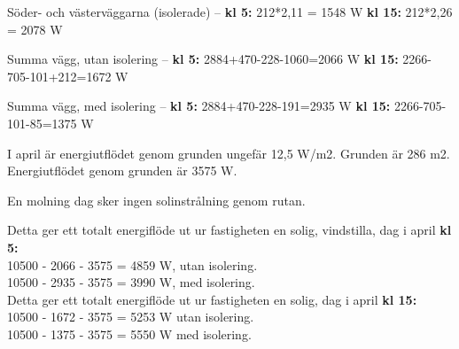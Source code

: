 Söder- och västerväggarna (isolerade) –
\textbf{kl 5:} 212*2,11 = 1548 W
\textbf{kl 15:} 212*2,26 = 2078 W

Summa vägg, utan isolering –
\textbf{kl 5:} 2884+470-228-1060=2066 W
\textbf{kl 15:} 2266-705-101+212=1672 W

Summa vägg, med isolering –
\textbf{kl 5:} 2884+470-228-191=2935 W
\textbf{kl 15:} 2266-705-101-85=1375 W

I april är energiutflödet genom grunden ungefär 12,5 W/m2. Grunden är 286 m2.\\
Energiutflödet genom grunden är 3575 W.

En molning dag sker ingen solinstrålning genom rutan.

Detta ger ett totalt energiflöde ut ur fastigheten en solig, vindstilla, dag i april \textbf{kl 5:}\\
10500 - 2066 - 3575 =  4859 W, utan isolering.\\
10500 - 2935 - 3575 =  3990 W, med isolering.\\

Detta ger ett totalt energiflöde ut ur fastigheten en solig, dag i april \textbf{kl 15:}\\
10500 - 1672 - 3575 = 5253 W utan isolering.\\
10500 - 1375 - 3575  =  5550 W med isolering.\\

